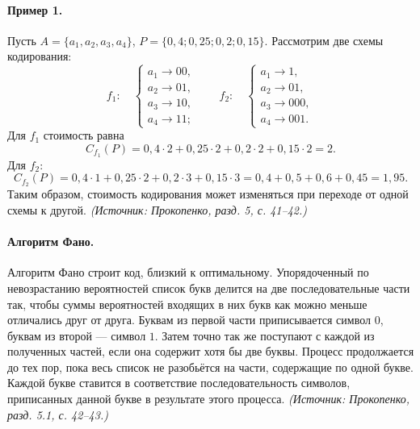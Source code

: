 \documentclass[a4paper,12pt]{article}
\begin{document}
\paragraph{Пример 1.}
Пусть \(A=\{a_1,a_2,a_3,a_4\}\), \(P=\{0{,}4;0{,}25;0{,}2;0{,}15\}\). Рассмотрим две схемы кодирования:
\[
f_1:\quad
\begin{cases}
a_1\to 00,\\
a_2\to 01,\\
a_3\to 10,\\
a_4\to 11;
\end{cases}
\qquad
f_2:\quad
\begin{cases}
a_1\to 1,\\
a_2\to 01,\\
a_3\to 000,\\
a_4\to 001.
\end{cases}
\]
Для \(f_1\) стоимость равна
\[
C_{f_1}(P)=0{,}4\cdot2+0{,}25\cdot2+0{,}2\cdot2+0{,}15\cdot2=2.
\]
Для \(f_2\):
\[
C_{f_2}(P)=0{,}4\cdot1+0{,}25\cdot2+0{,}2\cdot3+0{,}15\cdot3=0{,}4+0{,}5+0{,}6+0{,}45=1{,}95.
\]
Таким образом, стоимость кодирования может изменяться при переходе от одной схемы к другой.
\textit{(Источник: Прокопенко, разд. 5, с. 41--42.)}

\paragraph{Алгоритм Фано.}
Алгоритм Фано строит код, близкий к оптимальному. Упорядоченный по невозрастанию вероятностей список букв делится на две последовательные части так, чтобы суммы вероятностей входящих в них букв как можно меньше отличались друг от друга. Буквам из первой части приписывается символ \(0\), буквам из второй — символ \(1\). Затем точно так же поступают с каждой из полученных частей, если она содержит хотя бы две буквы. Процесс продолжается до тех пор, пока весь список не разобьётся на части, содержащие по одной букве. Каждой букве ставится в соответствие последовательность символов, приписанных данной букве в результате этого процесса.
\textit{(Источник: Прокопенко, разд. 5.1, с. 42--43.)}
\end{document}
